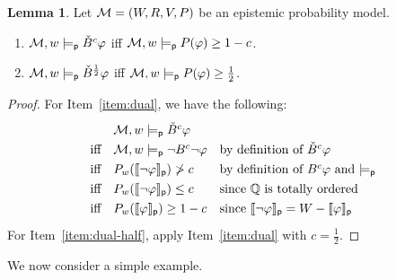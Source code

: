 \documentclass[12pt]{article}
\theoremstyle{definition}
\newtheorem{lemma}[theorem]{Lemma}
\newcommand{\Rat}{\mathbb{Q}}  %
\newcommand{\M}{{\cal M}}      %
\newcommand{\modelsp}{\models_{\mathsf{p}}}                  %
\newcommand{\semp}[1]{\llbracket{#1}\rrbracket_{\mathsf{p}}} %
\begin{document}
\begin{lemma}
  \label{lemma:dual}
  Let $\M=(W,R,V,P)$ be an epistemic probability model.
  \begin{enumerate}
  \item \label{item:dual} $\M,w\modelsp\check B^c\varphi$ iff
    $\M,w\modelsp P(\varphi)\geq 1-c$.

  \item \label{item:dual-half} $\M,w\modelsp\check B^{\frac 12}\varphi$ iff
    $\M,w\modelsp P(\varphi)\geq \frac 12$.

  \end{enumerate}
\end{lemma}
\begin{proof}
  For Item~\ref{item:dual}, we have the following:
  \[
  \renewcommand{\arraystretch}{1.3}
  \begin{array}{lll}
    &
    \M,w\modelsp\check B^c\varphi
    \\
    \text{iff} &
    \M,w\modelsp\lnot B^c\lnot\varphi 
    & \text{by definition of $\check B^c\varphi$}
    \\
    \text{iff} &
    P_w(\semp{\lnot\varphi})\not>c
    & \text{by definition of $B^c\varphi$ and $\modelsp$}
    \\
    \text{iff} &
    P_w(\semp{\lnot\varphi})\leq c
    & \text{since $\Rat$ is totally ordered}
    \\
    \text{iff} &
    P_w(\semp{\varphi})\geq 1-c
    & \text{since $\semp{\lnot\varphi}=W-\semp{\varphi}$}
  \end{array}
  \]
  For Item~\ref{item:dual-half}, apply Item~\ref{item:dual} 
  with $c =\frac 12$. 
\end{proof}


We now consider a simple example.
\end{document}
